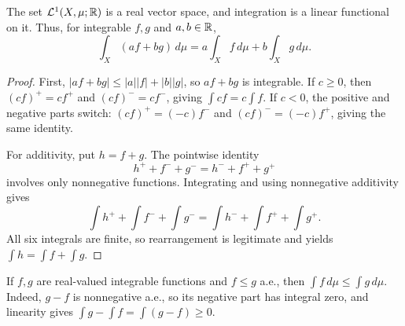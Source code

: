 \begin{proposition}
  \label{prop:real-linearity-sep-22}
  The set $\mathcal L^1(X,\mu;\mathbb{R})$ is a real vector space, and
  integration is a linear functional on it. Thus, for integrable
  $f,g$ and $a,b\in\mathbb{R}$,
  \[
    \int_X(af+bg)\,d\mu=a\int_X f\,d\mu+b\int_X g\,d\mu.
  \]
\end{proposition}

\begin{proof}
  First, $|af+bg|\leq|a||f|+|b||g|$, so $af+bg$ is integrable.
  If $c\geq0$, then $(cf)^+=cf^+$ and $(cf)^-=cf^-$, giving
  $\int cf=c\int f$. If $c<0$, the positive and negative parts switch:
  $(cf)^+=(-c)f^-$ and $(cf)^-=(-c)f^+$, giving the same identity.

  For additivity, put $h=f+g$. The pointwise identity
  \[
    h^++f^-+g^-=h^-+f^++g^+
  \]
  involves only nonnegative functions. Integrating and using
  nonnegative additivity gives
  \[
    \int h^++\int f^-+\int g^-
      =\int h^-+\int f^++\int g^+.
  \]
  All six integrals are finite, so rearrangement is legitimate and
  yields $\int h=\int f+\int g$.
\end{proof}

\begin{remark}
  If $f,g$ are real-valued integrable functions and $f\leq g$ a.e.,
  then $\int f\,d\mu\leq\int g\,d\mu$. Indeed, $g-f$ is
  nonnegative a.e., so its negative part has integral zero, and
  linearity gives $\int g-\int f=\int(g-f)\geq0$.
\end{remark}

\FloatBarrier
